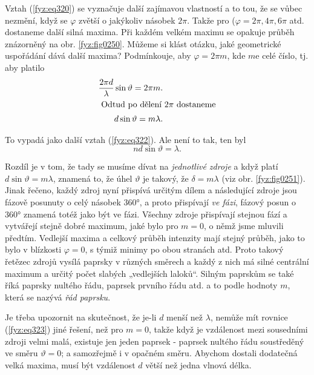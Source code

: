     Vztah (\ref{fyz:eq320}) se vyznačuje další zajímavou vlastností a to tou, že se vůbec nezmění, 
    když se \(\varphi\) zvětší o jakýkoliv násobek \(2\pi\). Takže pro (\(\varphi = 2\pi, 4\pi, 
    6\pi\) atd. dostaneme další silná maxima. Při každém velkém maximu se opakuje průběh znázorněný 
    na obr. \ref{fyz:fig0250}. Můžeme si klást otázku, jaké geometrické uspořádání dává další 
    maxima? Podmínkouje, aby \(\varphi=2\pi m\), kde \(m\)e celé číslo, tj. aby platilo
    \begin{align}
      \frac{2\pi d}{\lambda}\sin\vartheta = 2\pi m.         \nonumber \\
      \shortintertext{ Odtud po dělení \(2\pi\) dostaneme}  
      d\sin\vartheta = m\lambda.                            \label{fyz:eq323}
    \end{align}

    To vypadá jako další vztah (\ref{fyz:eq322}). Ale není to tak, ten byl 
    \begin{equation*}
      nd\sin\vartheta = \lambda.
    \end{equation*}
    
    Rozdíl je v tom, že tady se musíme dívat na \emph{jednotlivé zdroje} a když platí 
    \(d\sin\vartheta = m\lambda\), znamená to, že úhel \(\vartheta\) je takový, že \(\delta= 
    m\lambda\) (viz obr. \ref{fyz:fig0251}). Jinak řečeno, každý zdroj nyní přispívá určitým dílem a 
    následující zdroje jsou fázově posunuty o celý násobek \ang{360}, a proto přispívají 
    \emph{ve fázi}, fázový posun o \ang{360} znamená totéž jako být ve fázi. Všechny zdroje 
    přispívají stejnou fází a vytvářejí stejně dobré maximum, jaké bylo pro \(m = 0\), o němž jsme 
    mluvili předtím. Vedlejší maxima a celkový průběh intenzity mají stejný průběh, jako to bylo v 
    blízkosti \(\varphi = 0\), s týmiž minimy po obou stranách atd. Proto takový řetězec zdrojů 
    vysílá paprsky v různých směrech a každý z nich má silné centrální maximum a určitý počet 
    slabých „vedlejších laloků“. Silným paprskům se také říká paprsky nultého řádu, paprsek prvního 
    řádu atd. a to podle hodnoty \(m\), která se nazývá \emph{řád paprsku}.
    
    Je třeba upozornit na skutečnost, že je-li \(d\) menší než \(\lambda\), nemůže mít rovnice 
    (\ref{fyz:eq323}) jiné řešení, než pro \(m = 0\), takže když je vzdálenost mezi sousedními 
    zdroji velmi malá, existuje jen jeden paprsek - paprsek nultého řádu soustředěný ve směru 
    \(\vartheta = 0\); a samozřejmě i v opačném směru. Abychom dostali dodatečná velká maxima, musí 
    být vzdálenost \(d\) větší než jedna vlnová délka.
    
